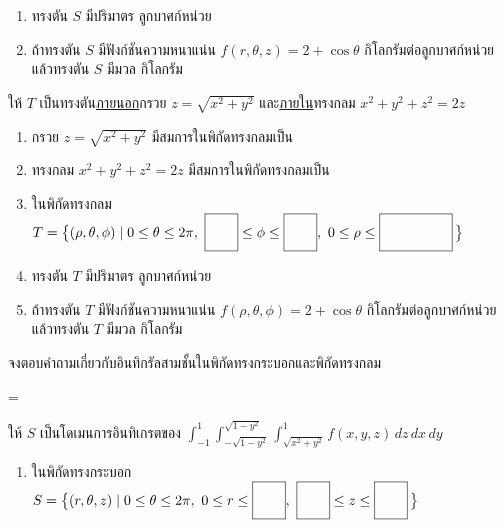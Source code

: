 \documentclass[12pt,final]{novelette} %
\begin{document}
\begin{question}
\begin{question}
\begin{enumerate}[label=(\alph*),itemsep=16pt,topsep=5pt]
            \item ทรงตัน $S$ มีปริมาตร \ansbox ลูกบาศก์หน่วย

                  \bigskip
            \item ถ้าทรงตัน $S$ มีฟังก์ชันความหนาแน่น $f(r, \theta, z) = 2 + \cos\theta$ กิโลกรัมต่อลูกบาศก์หน่วย \\[.5em]
                  แล้วทรงตัน $S$ มีมวล \ansbox กิโลกรัม
        \end{enumerate}

        \vspace{3.5em}

        \item ให้ $T$ เป็นทรงตัน\uline{ภายนอก}กรวย $z = \sqrt{x^2 + y^2}$ และ\uline{ภายใน}ทรงกลม $x^2 + y^2 + z^2 = 2z$
        \begin{enumerate}[label=(\alph*),itemsep=16pt,topsep=5pt]
            \item กรวย $z = \sqrt{x^2 + y^2}$ มีสมการในพิกัดทรงกลมเป็น \ansboxl

            \item ทรงกลม $x^2 + y^2 + z^2 = 2z$ มีสมการในพิกัดทรงกลมเป็น \ansboxl

            \item ในพิกัดทรงกลม \mbox{$T = \bigl\{(\rho, \theta, \phi) \mid 0 \leq \theta \leq 2\pi,\ \ansboxi{0.6cm} \leq \phi \leq \ansboxi{0.6cm},\ 0 \leq \rho \leq \ansboxi{1.6cm}\,\bigr\}$}

            \item ทรงตัน $T$ มีปริมาตร \ansbox ลูกบาศก์หน่วย

                  \bigskip
            \item ถ้าทรงตัน $T$ มีฟังก์ชันความหนาแน่น $f(\rho, \theta, \phi) = 2 + \cos\theta$ กิโลกรัมต่อลูกบาศก์หน่วย \\[.5em]
                  แล้วทรงตัน $T$ มีมวล \ansbox กิโลกรัม
        \end{enumerate}
    \end{question}

    \pagebreak

    \item {} %
     จงตอบคำถามเกี่ยวกับอินทิกรัลสามชั้นในพิกัดทรงกระบอกและพิกัดทรงกลม

    \medskip
    \begin{question}
        \everymath={\displaystyle}
        \item ให้ $S$ เป็นโดเมนการอินทิเกรตของ $\int_{-1}^1 \int_{-\sqrt{1-y^2}}^{\sqrt{1-y^2}} \int_{\sqrt{x^2+y^2}}^1 f(x, y, z) \, dz \, dx \, dy$
        \begin{enumerate}[label=(\alph*),itemsep=12pt,topsep=5pt]
            \item ในพิกัดทรงกระบอก $S = \bigl\{(r, \theta, z) \mid 0 \leq \theta \leq 2\pi,\ 0 \leq r \leq \ansboxi{0.6cm},\ \ansboxi{0.6cm} \leq z \leq \ansboxi{0.6cm}\,\bigr\}$


\end{enumerate}
\end{question}
\end{question}
\end{document}
